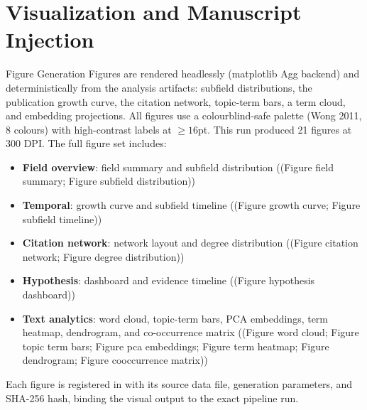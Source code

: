 \documentclass[
  ignorenonframetext,
]{beamer}
\author{\texorpdfstring{}{}}
\date{}
\providecommand{\tightlist}{%
  \setlength{\itemsep}{0pt}\setlength{\parskip}{0pt}}
\begin{document}
\section{Visualization and Manuscript
Injection}\label{visualization-and-manuscript-injection}

\begin{frame}{Figure Generation}
\protect{}\label{figure-generation}
Figures are rendered headlessly (matplotlib Agg backend) and
deterministically from the analysis artifacts: subfield distributions,
the publication growth curve, the citation network, topic-term bars, a
term cloud, and embedding projections. All figures use a
colourblind-safe palette (Wong 2011, 8 colours) with high-contrast
labels at \(\geq 16\)pt. This run produced 21 figures at 300 DPI. The
full figure set includes:

\begin{itemize}
\tightlist
\item
  \textbf{Field overview}: field summary and subfield distribution
  ((Figure field summary; Figure subfield distribution))
\item
  \textbf{Temporal}: growth curve and subfield timeline ((Figure growth
  curve; Figure subfield timeline))
\item
  \textbf{Citation network}: network layout and degree distribution
  ((Figure citation network; Figure degree distribution))
\item
  \textbf{Hypothesis}: dashboard and evidence timeline ((Figure
  hypothesis dashboard))
\item
  \textbf{Text analytics}: word cloud, topic-term bars, PCA embeddings,
  term heatmap, dendrogram, and co-occurrence matrix ((Figure word
  cloud; Figure topic term bars; Figure pca embeddings; Figure term
  heatmap; Figure dendrogram; Figure cooccurrence matrix))
\end{itemize}

Each figure is registered in  with its
source data file, generation parameters, and SHA-256 hash, binding the
visual output to the exact pipeline run.
\end{frame}
\end{document}
